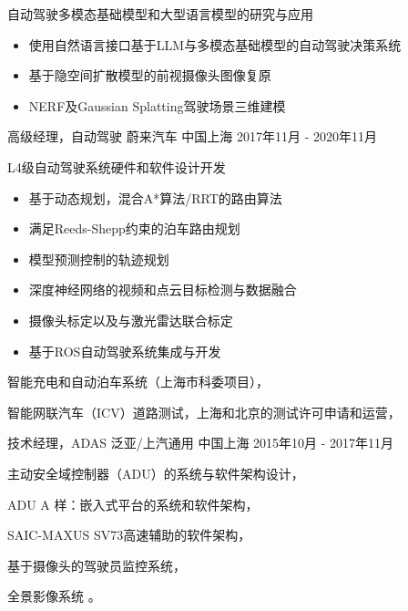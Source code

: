 \documentclass[../cv_cn.tex]{subfiles}
\begin{document}
\begin{cventries}
{\begin{cvitems}
\begin{itemize}
			\end{itemize}
			\item 自动驾驶多模态基础模型和大型语言模型的研究与应用
			\begin{itemize}
				\item 使用自然语言接口基于LLM与多模态基础模型的自动驾驶决策系统 \supercite{Xin_LLM_24} \supercite{Xin_VLM_24}
				\item 基于隐空间扩散模型的前视摄像头图像复原\supercite{Xin_Latent_Diffusion_23}
				\item NERF及Gaussian Splatting驾驶场景三维建模
			\end{itemize}
		\end{cvitems}
	}

	\cventry
	{高级经理，自动驾驶} %
	{蔚来汽车} %
	{中国上海} %
	{2017年11月 - 2020年11月} %
	{
		\begin{cvitems}
			\item L4级自动驾驶系统硬件和软件设计开发
			\begin{itemize}
				\item 基于动态规划，混合A*算法/RRT的路由算法
				\item 满足Reeds-Shepp约束的泊车路由规划
				\item 模型预测控制的轨迹规划
				\item 深度神经网络的视频和点云目标检测与数据融合
				\item 摄像头标定以及与激光雷达联合标定
				\item 基于ROS自动驾驶系统集成与开发
			\end{itemize}
			\item 智能充电和自动泊车系统（上海市科委项目），
			\item 智能网联汽车（ICV）道路测试，上海和北京的测试许可申请和运营，
		\end{cvitems}
	}

	\cventry
	{技术经理，ADAS} %
	{泛亚/上汽通用} %
	{中国上海} %
	{2015年10月 - 2017年11月} %
	{
		\begin{cvitems}
			\item 主动安全域控制器（ADU）的系统与软件架构设计，
			\item ADU A 样：嵌入式平台的系统和软件架构，
			\item SAIC-MAXUS SV73高速辅助的软件架构，
			\item 基于摄像头的驾驶员监控系统，
			\item 全景影像系统 \supercite{Xin_RearView_17}。
		\end{cvitems}
	}



\end{cventries}
\end{document}

